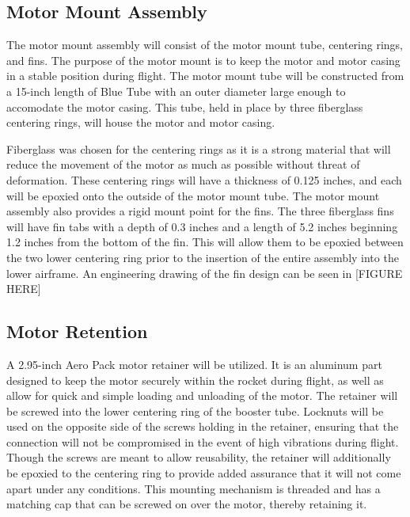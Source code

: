     \subsection{Motor Mount Assembly}
The motor mount assembly will consist of the motor mount tube, centering rings, and fins. The purpose of the motor mount is to keep the motor and motor casing in a stable position during flight. The motor mount tube will be constructed from a 15-inch length of Blue Tube with an outer diameter large enough to accomodate the motor casing. This tube, held in place by three fiberglass centering rings, will house the motor and motor casing.

Fiberglass was chosen for the centering rings as it is a strong material that will reduce the movement of the motor as much as possible without threat of deformation. These centering rings will have a thickness of 0.125 inches, and each will be epoxied onto the outside of the motor mount tube. The motor mount assembly also provides a rigid mount point for the fins. The three fiberglass fins will have fin tabs with a depth of 0.3 inches and a length of 5.2 inches beginning 1.2 inches from the bottom of the fin. This will allow them to be epoxied between the two lower centering ring prior to the insertion of the entire assembly into the lower airframe. An engineering drawing of the fin design can be seen in [FIGURE HERE]


    \subsection{Motor Retention}
A 2.95-inch Aero Pack motor retainer will be utilized. It is an aluminum part designed to keep the motor securely within the rocket during flight, as well as allow for quick and simple loading and unloading of the motor. The retainer will be screwed into the lower centering ring of the booster tube. Locknuts will be used on the opposite side of the screws holding in the retainer, ensuring that the connection will not be compromised in the event of high vibrations during flight. Though the screws are meant to allow reusability, the retainer will additionally be epoxied to the centering ring to provide added assurance that it will not come apart under any conditions. This mounting mechanism is threaded and has a matching cap that can be screwed on over the motor, thereby retaining it.

